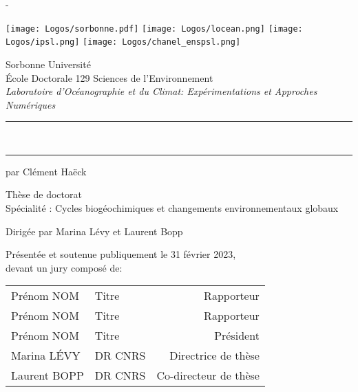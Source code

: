 

\begin{titlingpage}
\calccentering{\unitlength}
\begin{adjustwidth*}{\unitlength}{-\unitlength}

\vspace{-2em}

\begin{center}
  \texttt{[image: Logos/sorbonne.pdf]}
  \hfill
  \texttt{[image: Logos/locean.png]}
  \hfill
  \texttt{[image: Logos/ipsl.png]}
  \hfill
  \texttt{[image: Logos/chanel\_enspsl.png]}

  \vspace{3em}

  {\LARGE Sorbonne Université}\\[2ex]
  École Doctorale 129 Sciences de l'Environnement\\
  \emph{Laboratoire d'Océanographie et du Climat: Expérimentations et Approches Numériques}

  \vspace{3em}

  \par\noindent\rule[0.7em]{\textwidth}{2pt}
  {\bfseries\Large \Title}\\
  \par\noindent\rule{\textwidth}{2pt}

  \vspace{1em}

  {\normalsize par Clément Haëck}\\
  \vspace{3em}

  Thèse de doctorat\\
  Spécialité : Cycles biogéochimiques et changements environnementaux globaux

  \vspace{3em}

  Dirigée par Marina Lévy et Laurent Bopp

  \vspace{3em}
\end{center}

\par\noindent Présentée et soutenue publiquement le 31 février 2023,\\
devant un jury composé de:\\[1ex]
\begin{center}
\begin{tabular}{llr<{\raggedleft}}
  Prénom NOM & Titre & Rapporteur \\
  Prénom NOM & Titre & Rapporteur \\
  Prénom NOM & Titre & Président \\
  Marina LÉVY & DR CNRS & Directrice de thèse \\
  Laurent BOPP & DR CNRS & Co-directeur de thèse \\
\end{tabular}
\end{center}

\end{adjustwidth*}
\end{titlingpage}

